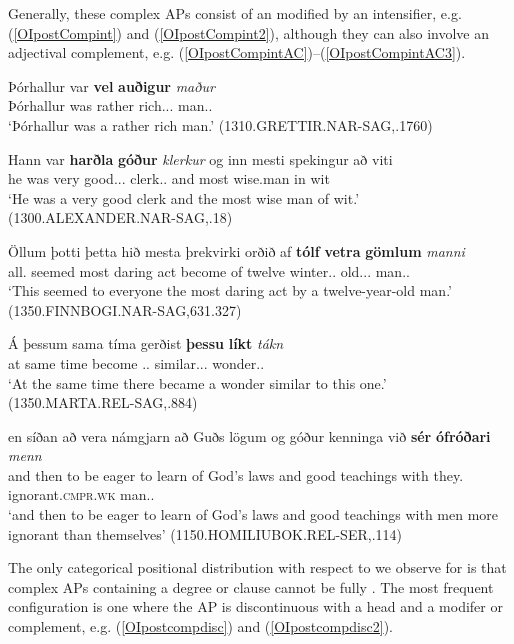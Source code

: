 \documentclass[output=paper,colorlinks,citecolor=brown,draft]{langscibook}
\begin{document}
Generally, these complex  APs consist of an  modified by an intensifier, e.g. (\ref{OIpostCompint}) and (\ref{OIpostCompint2}), although they can also involve an adjectival complement, e.g. (\ref{OIpostCompintAC})–(\ref{OIpostCompintAC3}).

\ea\label{OIpostCompint}
\gll Þórhallur var \textbf{vel} \textbf{auðigur} \textit{maður}\\
	Þórhallur was rather rich.\NOM.\SG.\STR{} man.\NOM.\SG{}\\
\glt ‘Þórhallur was a rather rich man.’ (1310.GRETTIR.NAR-SAG,.1760)
\z

\ea\label{OIpostCompint2}
\gll Hann var \textbf{harðla} \textbf{góður} \textit{klerkur} og inn mesti spekingur að viti\\
	he was very good.\NOM.\SG.\STR{} clerk.\NOM.\SG{} and \DEF{} most wise.man in wit\\
\glt ‘He was a very good clerk and the most wise man of wit.’ (1300.ALEXANDER.NAR-SAG,.18)
\z

\ea\label{OIpostCompintAC}
\gll Öllum þotti þetta hið mesta þrekvirki orðið af \textbf{tólf} \textbf{vetra} \textbf{gömlum} \textit{manni}\\
all.\DAT{} seemed \DEM{} \DEF{} most {daring act} become of twelve winter.\GEN.\PL{} old.\DAT.\SG.\STR{} man.\DAT.\SG{}\\
\glt ‘This seemed to everyone the most daring act by a twelve-year-old man.’ (1350.FINNBOGI.NAR-SAG,631.327)
\z

\ea\label{OIpostCompintAC2}
\gll Á þessum sama tíma gerðist \textbf{þessu} \textbf{líkt} \textit{tákn}\\
	at \DEM{} same time become \DEM.\DAT.\SG{} similar.\NOM.\SG.\STR{} wonder.\NOM.\SG{}\\
\glt ‘At the same time there became a wonder similar to this one.’ (1350.MARTA.REL-SAG,.884)
\z

\ea\label{OIpostCompintAC3}
\gll en síðan að vera námgjarn að Guðs lögum og góður kenninga við \textbf{sér} \textbf{ófróðari} \textit{menn}\\
and then to be {eager to learn} of God’s laws and good teachings with they.\REFL{} ignorant.\textsc{cmpr.wk} man.\ACC.\PL\\
\glt ‘and then to be eager to learn of God’s laws and good teachings with men more ignorant than themselves’ (1150.HOMILIUBOK.REL-SER,.114)
\z

The only categorical positional distribution with respect to  we observe for  is that complex APs containing a degree or  clause cannot be fully . The most frequent configuration is one where the AP is discontinuous with a  head  and a  modifer or complement, e.g. (\ref{OIpostcompdisc}) and (\ref{OIpostcompdisc2}).
\end{document}
